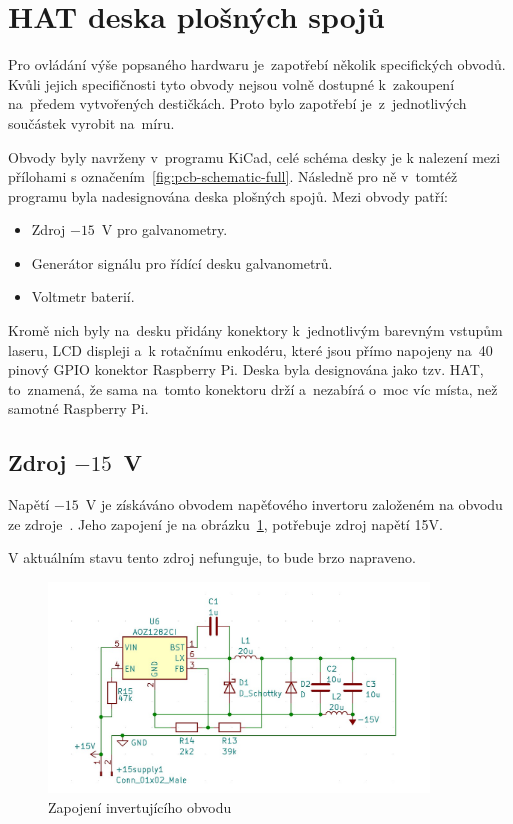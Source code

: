 \section{HAT deska plošných spojů}
Pro ovládání výše popsaného hardwaru je~zapotřebí několik specifických obvodů.
Kvůli jejich specifičnosti tyto obvody nejsou volně dostupné k~zakoupení na~předem vytvořených destičkách. Proto bylo zapotřebí je~z~jednotlivých součástek vyrobit na~míru.

Obvody byly navrženy v~programu KiCad, celé schéma desky je k nalezení mezi přílohami s označením~\ref{fig:pcb-schematic-full}. Následně pro ně v~tomtéž programu byla nadesignována deska plošných spojů. Mezi obvody patří:
\begin{itemize}
  \item Zdroj $-15$~V pro galvanometry.
  \item Generátor signálu pro řídící desku galvanometrů.
  \item Voltmetr baterií.
\end{itemize}

Kromě nich byly na~desku přidány konektory k~jednotlivým barevným vstupům laseru, LCD displeji a~k rotačnímu enkodéru, které jsou přímo napojeny na~40 pinový GPIO konektor Raspberry Pi.
Deska byla designována jako tzv. HAT, to~znamená, že sama na~tomto konektoru drží a~nezabírá o~moc víc místa, než samotné Raspberry Pi.

\subsection{Zdroj $-15$~V}\label{sec:negative-ps}
Napětí $-15$~V je získáváno obvodem napěťového invertoru založeném na obvodu ze zdroje~\cite{ampalyzer}. Jeho zapojení je na obrázku~\ref{fig:negative-ps}, potřebuje zdroj napětí 15V.

V aktuálním stavu tento zdroj nefunguje, to bude brzo napraveno.

\begin{figure}[htb]
  \centering
  \includegraphics[width=0.9\textwidth]{img/negative-ps.jpg}
  \caption{\label{fig:negative-ps} Zapojení invertujícího obvodu}
\end{figure}

